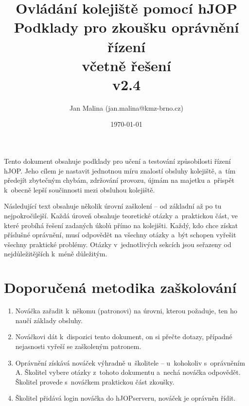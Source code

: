 \documentclass[12pt,a4paper]{article}
\begin{document}
\thispagestyle{empty}

\setlength{\parindent}{0cm}
\setlength{\parskip}{.4\baselineskip plus2pt minus1pt}
\setlength{\droptitle}{-5em}

\title{\bfseries
{\Large Ovládání kolejiště pomocí hJOP\\}
{\LARGE Podklady pro zkoušku oprávnění řízení\\}
\ifsolution
{\Large \color{gray}včetně řešení\\}
\fi
{\small v2.4}}
\author{Jan Malina (jan.malina@kmz-brno.cz)}
\date{\today}
\maketitle

Tento dokument obsahuje podklady pro učení a testování způsobilosti řízení
hJOP. Jeho cílem je nastavit jednotnou míru znalostí obsluhy kolejiště, a~tím
předejít zbytečným chybám, zdržování provozu, újmám na majetku a~přispět
k~obecně lepší součinnosti mezi obsluhou kolejiště.

Následující text obsahuje několik úrovní zaškolení – od základní až po tu
nejpokročilejší. Každá úroveň obsahuje teoretické otázky a~praktickou část, ve
které probíhá řešení zadaných úkolů přímo na kolejišti. Každý, kdo chce získat
příslušné oprávnění, musí odpovědět na všechny otázky a~být schopen vyřešit
všechny praktické problémy. Otázky v~jednotlivých sekcích jsou seřazeny od
nejdůležitějších k~méně důležitým.

\section{Doporučená metodika zaškolování}

\begin{enumerate}[leftmargin=*]
\item Nováčka zařadit k~někomu (patronovi) na úrovni, kterou požaduje, ten ho
naučí základy obsluhy.
\item Nováčkovi dát k~dispozici tento dokument, on si přečte dotazy, případné
nejasnosti vyřeší se zaškoleným patronem.
\item Oprávnění získává nováček výhradně u~školitele – u~kohokoliv s~oprávněním
A.
Školitel vybere otázky z~tohoto dokumentu a~nechá nováčka odpovědět. Školitel
provede s~no\-váč\-kem praktickou část zkoušky.
\item Školitel přidává login nováčka do hJOPserveru, nováček je oprávněn řídit.
\end{enumerate}
\end{document}

